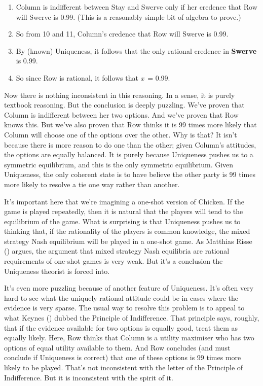 \documentclass[
  11pt,
  letterpaper,
  DIV=11,
  numbers=noendperiod,
  twoside]{scrartcl}
\begin{document}
\begin{enumerate}
  what Column will do, it must be that Column is indifferent between
  Stay and Swerve given her (i.e., Column's) credences about what Row
  will do.\footnote{If Column was not indifferent between their options,
    the knowledge Row has by step 6 would be sufficient to deduce with
    certainty what Column will do. But at step 9 we showed that Row does
    not know what Column will do.}
\item
  Column is indifferent between Stay and Swerve only if her credence
  that Row will Swerve is 0.99. (This is a reasonably simple bit of
  algebra to prove.)
\item
  So from 10 and 11, Column's credence that Row will Swerve is 0.99.
\item
  By (known) Uniqueness, it follows that the only rational credence in
  \textbf{Swerve} is 0.99.
\item
  So since Row is rational, it follows that \emph{x}~= 0.99.
\end{enumerate}

Now there is nothing inconsistent in this reasoning. In a sense, it is
purely textbook reasoning. But the conclusion is deeply puzzling. We've
proven that Column is indifferent between her two options. And we've
proven that Row knows this. But we've also proven that Row thinks it is
99 times more likely that Column will choose one of the options over the
other. Why is that? It isn't because there is more reason to do one than
the other; given Column's attitudes, the options are equally balanced.
It is purely because Uniqueness pushes us to a symmetric equilibrium,
and this is the only symmetric equilibrium. Given Uniqueness, the only
coherent state is to have believe the other party is 99 times more
likely to resolve a tie one way rather than another.

It's important here that we're imagining a one-shot version of Chicken.
If the game is played repeatedly, then it is natural that the players
will tend to the equilibrium of the game. What is surprising is that
Uniqueness pushes us to thinking that, if the rationality of the players
is common knowledge, the mixed strategy Nash equilibrium will be played
in a one-shot game. As Matthias Risse ()
argues, the argument that mixed strategy Nash equilibria are rational
requirements of one-shot games is very weak. But it's a conclusion the
Uniqueness theorist is forced into.

It's even more puzzling because of another feature of Uniqueness. It's
often very hard to see what the uniquely rational attitude could be in
cases where the evidence is very sparse. The usual way to resolve this
problem is to appeal to what Keynes ()
dubbed the Principle of Indifference. That principle says, roughly, that
if the evidence available for two options is equally good, treat them as
equally likely. Here, Row thinks that Column is a utility maximiser who
has two options of equal utility available to them. And Row concludes
(and must conclude if Uniqueness is correct) that one of these options
is 99 times more likely to be played. That's not inconsistent with the
letter of the Principle of Indifference. But it is inconsistent with the
spirit of it.
\end{document}
